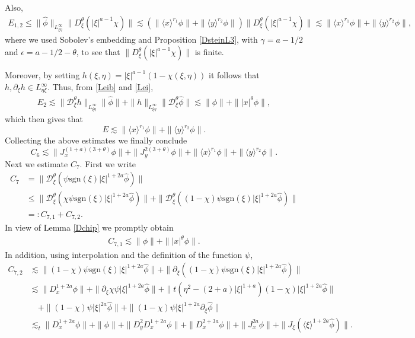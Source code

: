 \documentclass[reqno]{amsart}
\newcommand{\ha}{\hat{\phi}}
\newcommand{\les}{\lesssim}
\newcommand{\si}{\sgn(\xi)}
\newcommand{\lan}{\langle \xi \rangle}
\newcommand{\lanx}{\langle x \rangle}
\newcommand{\lany}{\langle y \rangle}
\newcommand{\Dt}{\mathcal{D}^{\theta}_\xi}
\newcommand{\p}{\partial}
\newcommand{\sgn}{\text{sgn}}
\numberwithin{equation}{section}
\begin{document}
Also,
\begin{equation*}
\begin{split}\label{Pxi}
 E_{1,2} \leq  \|\ha\|_{L^\infty_{\xi \eta}}\|D_\xi^\theta (|\xi|^{a-1}\chi)\|
\les  (\|\lanx^{r_1}\phi\|+\|\lany^{r_2}\phi\|)\|D_\xi^\theta (|\xi|^{a-1}\chi)\|
\les\|\lanx^{r_1}\phi\|+\|\lany^{r_2}\phi\|,
\end{split}
\end{equation*}
where we used Sobolev's embedding and  Proposition \ref{DsteinL3}, with $\gamma=a-1/2$ and $\epsilon=a-1/2-\theta$, to see that $\|D_\xi^\theta (|\xi|^{a-1}\chi)\|$ is finite.  

 
Moreover, by setting $h(\xi,\eta)=|\xi|^{a-1}(1-\chi(\xi,\eta))$ it follows that $h,\p_\xi h \in L^\infty_{\eta \xi}$. Thus, from \eqref{Leib} and \eqref{Lei},
\begin{equation*}
\begin{split}\label{M2}
E_2 \lesssim \|\Dt h\|_{L^\infty_{\xi\eta}}\|\ha\|+\|h\|_{L^\infty_{\xi\eta}}\|\Dt \ha\|
\lesssim \|\phi\|+\||x|^\theta \phi\|,
\end{split}
\end{equation*}
which then gives that
$$
E\lesssim \|\lanx^{r_1}\phi\|+\|\lany^{r_2}\phi\|.
$$
Collecting the above estimates we finally conclude 
\begin{equation}\label{C6}
C_6\lesssim \|J_x^{(1+a)(3+\theta)}\phi\|+\|J_y^{2(3+\theta)}\phi\|+\|\lanx^{r_1}\phi\|+\|\lany^{r_2}\phi\|.
\end{equation}
 Next we estimate $C_7$. First we write 
 \begin{equation*}
 \begin{split}\label{c7}
 C_7&=\|\Dt(\psi \si|\xi|^{1+2a} \ha)\|\\
 &\leq \|\Dt(\chi \psi \si|\xi|^{1+2a}\ha)\|+\|\Dt((1-\chi) \psi \si|\xi|^{1+2a}\ha)\|\\
 &=:C_{7,1}+C_{7,2}.
 \end{split}
 \end{equation*}
In view of Lemma  \ref{Dchip} we promptly obtain
 \begin{equation}\label{C71}
 \begin{split}
 C_{7,1}\lesssim \|\phi\|+\||x|^\theta \phi\|.
 \end{split}
 \end{equation}
In addition, using interpolation and the definition of the function $\psi$,
 \begin{equation*}
 \begin{split}
 C_{7,2}&\lesssim  \|(1-\chi)\psi \si |\xi|^{1+2a}\ha\|+\|\p_\xi ((1-\chi) \psi \si|\xi|^{1+2a}\ha)\|\\
 &\lesssim \|D_x^{1+2a}\phi\|+\|\p_\xi \chi  \psi |\xi|^{1+2a}\ha\|+\|t(\eta^2-(2+a)|\xi|^{1+a})(1-\chi)|\xi|^{1+2a}\ha\|\\
 &\quad+\|(1-\chi)\psi |\xi|^{2a} \ha\|+ \|(1-\chi)\psi |\xi|^{1+2a}\p_\xi \ha\|\\
 &\lesssim_t \|D_x^{1+2a}\phi\|+\|\phi\|+\|D_y^2 D_x^{1+2a}\phi\|+\|D_x^{2+3a}\phi\|+\|J_x^{2a}\phi\|+\|J_\xi(\lan^{1+2a}\ha)\|.
 \end{split}
 \end{equation*}
\end{document}

